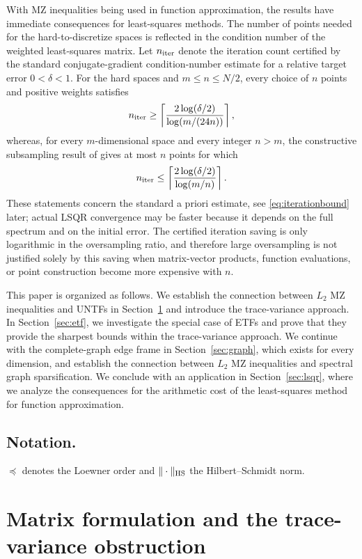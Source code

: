 \documentclass[a4paper]{amsart}
\numberwithin{equation}{section}
\begin{document}
With MZ inequalities being used in function approximation, the results have immediate consequences for least-squares methods.
The number of points needed for the hard-to-discretize spaces is reflected in the condition number of the weighted least-squares matrix.
Let $n_{\rm iter}$ denote the iteration count certified by the standard conjugate-gradient condition-number estimate for a relative target error $0<\delta<1$.
For the hard spaces and $m\le n\le N/2$, every choice of $n$ points and positive weights satisfies
\begin{equation*}
    n_{\rm iter}
    \ge \left\lceil\frac{2\log(\delta/2)}{\log(m/(24n))}\right\rceil,
\end{equation*}
whereas, for every $m$-dimensional space and every integer $n>m$, the constructive subsampling result of \cite{BSU23} gives at most $n$ points for which
\begin{equation*}
    n_{\rm iter}
    \le \left\lceil\frac{2\log(\delta/2)}{\log(m/n)}\right\rceil.
\end{equation*}
These statements concern the standard a priori estimate, see \eqref{eq:iterationbound} later; actual LSQR convergence may be faster because it depends on the full spectrum and on the initial error.
The certified iteration saving is only logarithmic in the oversampling ratio, and therefore large oversampling is not justified solely by this saving when matrix-vector products, function evaluations, or point construction become more expensive with $n$.

This paper is organized as follows.
We establish the connection between $L_2$ MZ inequalities and UNTFs in Section~\ref{sec:untf} and introduce the trace-variance approach.
In Section~\ref{sec:etf}, we investigate the special case of ETFs and prove that they provide the sharpest bounds within the trace-variance approach.
We continue with the complete-graph edge frame in Section~\ref{sec:graph}, which exists for every dimension, and establish the connection between $L_2$ MZ inequalities and spectral graph sparsification.
We conclude with an application in Section~\ref{sec:lsqr}, where we analyze the consequences for the arithmetic cost of the least-squares method for function approximation.

\subsection*{Notation.}
$\preceq$ denotes the Loewner order and
$\|\cdot\|_{\rm HS}$ the Hilbert--Schmidt norm.
 \section{Matrix formulation and the trace-variance obstruction}\label{sec:untf}
\end{document}
